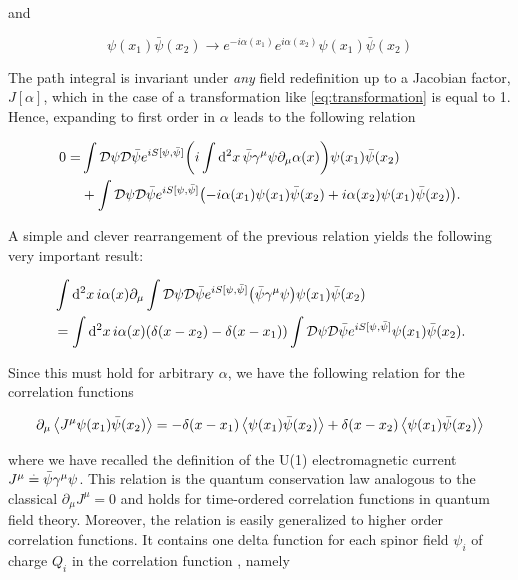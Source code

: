 and

\begin{equation}
    \psi(x_1)\bar\psi(x_2)\to e^{-i\alpha(x_1)}e^{i\alpha(x_2)}\psi(x_1)\bar\psi(x_2)
\end{equation}

The path integral is invariant under \emph{any} field redefinition up to a Jacobian factor, $J[\alpha]$, which in the case of a transformation like \eqref{eq:transformation} is equal to 1. Hence, expanding to first order in $\alpha$ leads to the following relation

\begin{align}
    0 = &\int \mathcal{D}\psi \mathcal{D}\bar\psi e^{i S[\psi,\bar\psi]}\qty(i \int \dd[2]{x}\bar\psi\gamma^\mu\psi\partial_\mu\alpha(x))\psi(x_1)\bar\psi(x_2)\nonumber\\
    &+ \int \mathcal{D}\psi \mathcal{D}\bar\psi e^{i S[\psi,\bar\psi]}\qty(-i\alpha(x_1)\psi(x_1)\bar\psi(x_2) + i\alpha(x_2) \psi(x_1)\bar\psi(x_2)).
\end{align}

A simple and clever rearrangement of the previous relation yields the following very important result:

\begin{align}
    &\int \dd[2]{x}i \alpha(x)\partial_\mu \int \mathcal{D}\psi \mathcal{D}\bar\psi e^{i S[\psi,\bar\psi]}\qty(\bar\psi\gamma^\mu\psi)\psi(x_1)\bar\psi(x_2)\nonumber\\
    &= \int \dd[2]{x}i \alpha(x) \qty(\delta(x-x_2) - \delta(x-x_1))\int \mathcal{D}\psi \mathcal{D}\bar\psi e^{i S[\psi,\bar\psi]}\psi(x_1)\bar\psi(x_2).
\end{align}

Since this must hold for arbitrary $\alpha$, we have the following relation for the correlation functions

\begin{equation}
\partial_\mu \expval{J^\mu\psi(x_1)\bar\psi(x_2)} = -\delta(x-x_1)\expval{\psi(x_1)\bar\psi(x_2)} + \delta(x-x_2)\expval{\psi(x_1)\bar\psi(x_2)}
\end{equation}

where we have recalled the definition of the U(1) electromagnetic current $J^\mu \overset{.}{=}\bar\psi\gamma^\mu\psi$. This relation is the quantum conservation law analogous to the classical $\partial_\mu J^\mu = 0$ and holds for time-ordered correlation functions in quantum field theory. Moreover, the relation is easily generalized to higher order correlation functions. It contains one delta function for each spinor field $ \psi_i$ of charge $Q_i$ in the correlation function \cite{Schwartz}, namely


